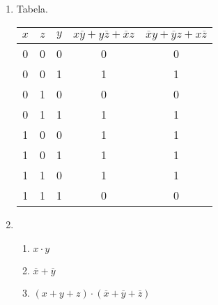 \documentclass{article}
\begin{document}
\begin{enumerate}
	\item Tabela.
	      \begin{center}
		      \begin{tabular}{|c c c c c|}
			      \hline
			      \( x \)                            & \( z \)             & \( y \) & \( x \overline{y} + y
			      \overline{z} + \overline{x} z   \) & \( \overline{x} y +
			      \overline{y} z + x \overline{z}   \)                                                           \\ [0.5ex]
			      \hline\hline
			      0                                  & 0                   & 0       & 0                     & 0 \\ \hline
			      0                                  & 0                   & 1       & 1                     & 1 \\
			      \hline
			      0                                  & 1                   & 0       & 0                     & 0 \\
			      \hline
			      0                                  & 1                   & 1       & 1                     & 1 \\
			      \hline
			      1                                  & 0                   & 0       & 1                     & 1 \\
			      \hline
			      1                                  & 0                   & 1       & 1                     & 1 \\
			      \hline
			      1                                  & 1                   & 0       & 1                     & 1 \\
			      \hline
			      1                                  & 1                   & 1       & 0                     & 0 \\
			      \hline
		      \end{tabular}
	      \end{center}

	\item

	      \begin{enumerate}

		      \item \( x \cdot y \)

		      \item \( \overline{x} + \overline{y} \)

		      \item \( (x + y + z) \cdot (\overline{x} + \overline{y} +
		            \overline{z}) \)


\end{enumerate}
\end{enumerate}
\end{document}
